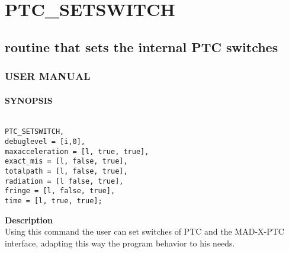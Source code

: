 


\section{PTC\_SETSWITCH}

\subsection{ routine that sets the internal PTC switches }




\subsubsection{   USER MANUAL   }


\paragraph{SYNOPSIS}
\begin{verbatim}

PTC_SETSWITCH,
debuglevel = [i,0], 
maxacceleration = [l, true, true],
exact_mis = [l, false, true],
totalpath = [l, false, true],
radiation = [l false, true],
fringe = [l, false, true],
time = [l, true, true];
\end{verbatim}


\textbf{ Description } \\

Using this command the user can set switches of PTC and the MAD-X-PTC interface, adapting  this way the program behavior to his needs.  

